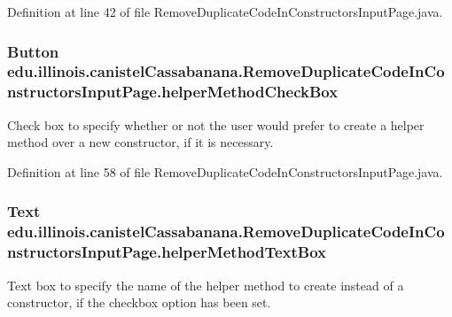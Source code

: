 Definition at line 42 of file RemoveDuplicateCodeInConstructorsInputPage.java.

\hypertarget{classedu_1_1illinois_1_1canistelCassabanana_1_1RemoveDuplicateCodeInConstructorsInputPage_ae4b00020b66a4de901af986961ea91e4}{
\subsubsection[{helperMethodCheckBox}]{\setlength{\rightskip}{0pt plus 5cm}Button {\bf edu.illinois.canistelCassabanana.RemoveDuplicateCodeInConstructorsInputPage.helperMethodCheckBox}}}
\label{classedu_1_1illinois_1_1canistelCassabanana_1_1RemoveDuplicateCodeInConstructorsInputPage_ae4b00020b66a4de901af986961ea91e4}
Check box to specify whether or not the user would prefer to create a helper method over a new constructor, if it is necessary. 

Definition at line 58 of file RemoveDuplicateCodeInConstructorsInputPage.java.

\hypertarget{classedu_1_1illinois_1_1canistelCassabanana_1_1RemoveDuplicateCodeInConstructorsInputPage_a55a3b8c570da15f43d270768908aeab3}{
\subsubsection[{helperMethodTextBox}]{\setlength{\rightskip}{0pt plus 5cm}Text {\bf edu.illinois.canistelCassabanana.RemoveDuplicateCodeInConstructorsInputPage.helperMethodTextBox}}}
\label{classedu_1_1illinois_1_1canistelCassabanana_1_1RemoveDuplicateCodeInConstructorsInputPage_a55a3b8c570da15f43d270768908aeab3}
Text box to specify the name of the helper method to create instead of a constructor, if the checkbox option has been set. 

